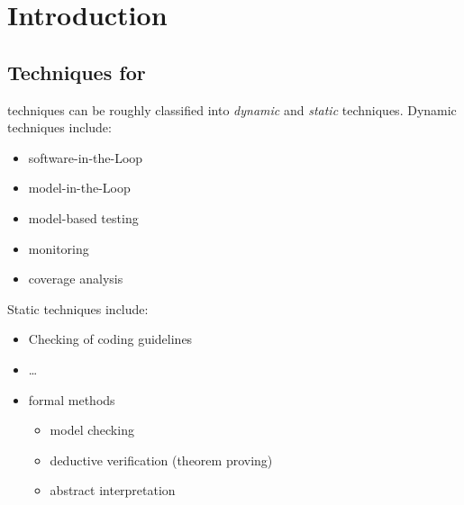 \section*{Introduction}
\tbd
\subsection{Techniques for \VV}

\VV techniques can be roughly classified into \emph{dynamic} and \emph{static} techniques.
Dynamic  \vv techniques include:
\begin{itemize}
\item software-in-the-Loop
\item model-in-the-Loop
\item model-based testing
\item monitoring
\item coverage analysis
\end{itemize}

Static \vv techniques include:
\begin{itemize}
\item Checking of coding guidelines
\item \ldots
\item formal methods
\begin{itemize}
\item model checking
\item deductive verification (theorem proving)
\item abstract interpretation
\end{itemize}
\end{itemize}

%


